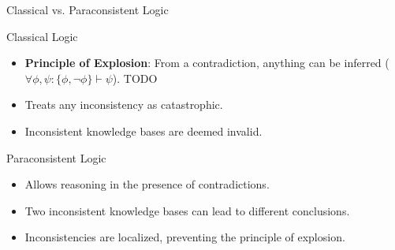 \begin{frame}{Classical vs. Paraconsistent Logic}
    \begin{block}{Classical Logic}
        \begin{itemize}
            \item \textbf{Principle of Explosion}: From a contradiction, anything can be inferred (\( \forall \phi, \psi: \{\phi, \neg \phi\} \vdash \psi \)). TODO
            \item Treats any inconsistency as catastrophic.
            \item Inconsistent knowledge bases are deemed invalid.
        \end{itemize}
    \end{block}
    \begin{block}{Paraconsistent Logic}
        \begin{itemize}
            \item Allows reasoning in the presence of contradictions.
            \item Two inconsistent knowledge bases can lead to different conclusions.
            \item Inconsistencies are localized, preventing the principle of explosion.
        \end{itemize}
    \end{block}
\end{frame}

